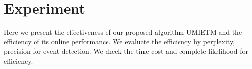 \documentclass{llncs}
\begin{document}

\section{Experiment}
Here we present the effectiveness of our proposed algorithm UMIETM and the efficiency of its online performance.
We evaluate the efficiency by perplexity, precision for event detection. 
We check the time cost and complete likelihood for efficiency.
\end{document}
